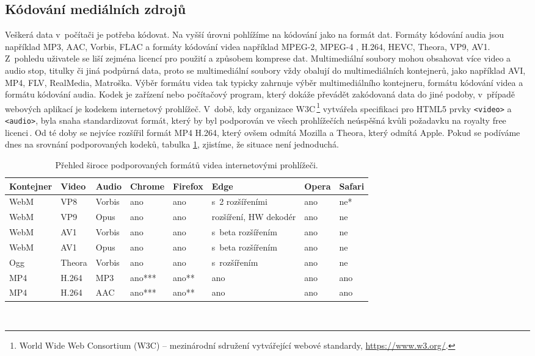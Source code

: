 \subsection{Kódování mediálních zdrojů}
Veškerá data v~počítači je potřeba kódovat. Na vyšší úrovni pohlížíme na kódování jako na formát dat. Formáty kódování audia  jsou například MP3, AAC, Vorbis, FLAC a formáty kódování videa například MPEG-2, MPEG-4 , H.264, HEVC, Theora, VP9, AV1.  Z~pohledu uživatele se liší zejména licencí pro použití a způsobem komprese dat. Multimediální soubory mohou obsahovat více video a audio stop, titulky či jiná podpůrná data, proto se multimediální soubory vždy obalují do multimediálních kontejnerů, jako například AVI, MP4, FLV, RealMedia, Matroška. Výběr formátu videa tak typicky zahrnuje výběr multimediálního kontejneru, formátu kódování videa a formátu kódování audia. Kodek je zařízení nebo počítačový program, který dokáže převádět zakódovaná data do jiné podoby, v~případě webových aplikací je kodekem internetový prohlížeč. V~době, kdy organizace W3C\,\footnote{World Wide Web Consortium (W3C) -- mezinárodní sdružení vytvářející webové standardy, \url{https://www.w3.org/}.} vytvářela specifikaci pro HTML5 prvky \texttt{<video>} a \texttt{<audio>}, byla snaha standardizovat formát, který by byl podporován ve všech prohlížečích neúspěšná kvůli požadavku na royalty free licenci\,\cite{HTML5multimedia}. Od té doby se nejvíce rozšířil formát MP4 H.264, který ovšem odmítá Mozilla a Theora, který odmítá Apple. Pokud se podíváme dnes na srovnání podporovaných kodeků, tabulka \ref{tab:codecs}, zjistíme, že situace není jednoduchá.
\begin{table}[h]
    \centering
    \begin{tabular}{|l|l|l||l|l|l|l|l|}
    \hline
    Kontejner   & Video & Audio & Chrome & Firefox & Edge & Opera & Safari \\
    \hline
    WebM        & VP8   & Vorbis &ano & ano & s~2 rozšířeními & ano & ne* \\
    WebM        & VP9   & Opus & ano & ano & rozšíření, HW dekodér & ano & ne \\
    WebM        & AV1   & Vorbis & ano & ano & s~beta rozšířením & ano & ne \\
    WebM        & AV1   & Opus & ano & ano & s~beta rozšířením & ano & ne \\
    Ogg         & Theora & Vorbis & ano & ano & s~rozšířením & ano & ne \\
    MP4         & H.264 & MP3 & ano*** & ano** & ano & ano & ano \\
    MP4         & H.264 & AAC & ano*** & ano** & ano & ano & ano \\
    \hline
    \end{tabular}
    \caption{Přehled široce podporovaných formátů videa internetovými prohlížeči.}
    \label{tab:codecs}
\end{table}\\
